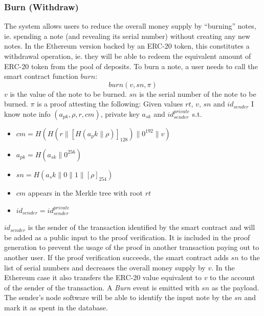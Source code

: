 \documentclass{article}
\newcommand{\conc}{\mathbin{\|}}
\begin{document}
\pagebreak

\subsubsection{Burn (Withdraw)} \label{burn}
The system allows users to reduce the overall money supply by ``burning'' notes, ie. spending a note (and revealing its serial number) without creating any new notes. In the Ethereum version backed by an ERC-20 token, this constitutes a withdrawal operation, ie. they will be able to redeem the equivalent amount of ERC-20 token from the pool of deposits.
To burn a note, a user needs to call the smart contract function $burn$: $$burn(v, sn, \pi)$$ $v$ is the value of the note to be burned. $sn$ is the serial number of the note to be burned. $\pi$ is a proof attesting the following: Given values $rt$, $v$, $sn$ and  $id_{sender}$ I know note info $(a_{pk}, \rho, r, cm)$, private key $a_{sk}$ and $id_{sender}^{private}$ s.t.
\begin{itemize}
    \item $cm = H(H(r \conc [H(a_pk \conc \rho)]_{128}) \conc 0^{192} \conc v)$
    \item $a_{pk} = H(a_{sk} \conc 0^{256})$
    \item $sn = H(a_sk \conc 0 \conc 1 \conc [\rho]_{254})$
    \item $cm$ appears in the Merkle tree with root $rt$
    \item $id_{sender} = id_{sender}^{private}$
\end{itemize}
$id_{sender}$ is the sender of the transaction identified by the smart contract and will be added as a public input to the proof verification. It is included in the proof generation to prevent the usage of the proof in another transaction paying out to another user. If the proof verification succeeds, the smart contract adds $sn$ to the list of serial numbers and decreases the overall money supply by $v$. In the Ethereum case it also transfers the ERC-20 value equivalent to $v$ to the account of the sender of the transaction. A \textit{Burn} event is emitted with ${sn}$ as the payload. The sender's node software will be able to identify the input note by the $sn$ and mark it as spent in the database.
\end{document}
